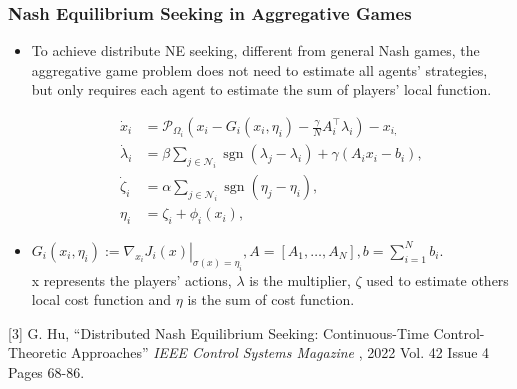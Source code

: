\begin{frame}
  \frametitle{\normalsize{Nash Equilibrium Seeking in  Aggregative Games}}\small


\begin{itemize}
  \item To achieve distribute NE seeking, different from general Nash games, the aggregative game problem does not need to estimate all agents’ strategies, but only requires
  each agent to estimate the sum of players' local function.

  \begin{equation}
  \begin{aligned}
    \dot{x}_{i}&=\mathcal{P}_{\Omega_{i}}\left(x_{i}-G_{i}\left(x_{i}, \eta_{i}\right)-\frac{\gamma}{N} A_{i}^{\top} \lambda_{i}\right)-x_{i,} \\
    \dot{\lambda}_{i}&=\beta \sum_{j \in \mathcal{N}_{i}} \operatorname{sgn}\left(\lambda_{j}-\lambda_{i}\right)+\gamma\left(A_{i} x_{i}-b_{i}\right), \\
    \dot{\zeta}_{i}&=\alpha \sum_{j \in \mathcal{N}_{i}} \operatorname{sgn}\left(\eta_{j}-\eta_{i}\right), \\
    \eta_{i}&=\zeta_{i}+\phi_{i}\left(x_{i}\right),  
  \end{aligned}
  \end{equation}

  \item 
   $G_{i}\left(x_{i}, \eta_{i}\right):=\left.\nabla_{x_{i}} J_{i}(x)\right|_{\sigma(x)=\eta_{i}}, A=\left[A_{1}, \ldots, A_{N}\right], b=\sum_{i=1}^{N} b_{i} $.\\
  x represents the players' actions, $\lambda$ is the multiplier, $\zeta$ used to estimate others local cost function and $\eta$ is the sum of cost function.
\end{itemize}
\breference
\scriptsize
[3] G. Hu, ``Distributed Nash Equilibrium Seeking: Continuous-Time Control-Theoretic Approaches''  \emph{IEEE Control Systems Magazine }, 2022 Vol. 42 Issue 4 Pages 68-86.
\ereference
\end{frame}

